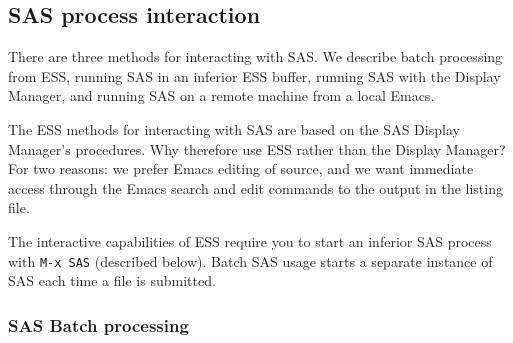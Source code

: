 \documentclass{article}
\newcommand{\stexttt}[1]{{\small\texttt{#1}}}
\begin{document}
\subsection{SAS process interaction}
\label{sec:SAS:proc}

There are three methods for interacting with SAS.  We describe batch
processing from ESS, running SAS in an inferior ESS buffer, running
SAS with the Display Manager, and running SAS on a remote machine from
a local Emacs.

The ESS methods for interacting with SAS are based on the SAS Display
Manager's procedures.  Why therefore use ESS rather than the Display
Manager?  For two reasons: we prefer Emacs editing of source, and we
want immediate access through the Emacs search and edit commands to
the output in the listing file.
 

The interactive capabilities of ESS require you to start an inferior
SAS process with \stexttt{M-x SAS} (described below).  Batch SAS usage
starts a separate instance of SAS each time a file is submitted.

\subsubsection{SAS Batch processing}
\label{sec:SAS:proc:batch}
\end{document}
